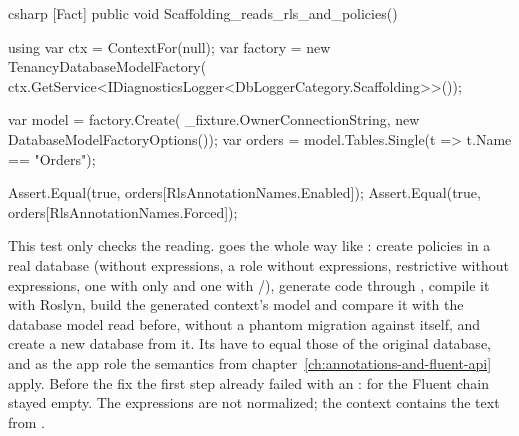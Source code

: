 \begin{sourcecode}{csharp}
[Fact]
public void Scaffolding_reads_rls_and_policies()
{
    using var ctx = ContextFor(null);
    var factory = new TenancyDatabaseModelFactory(
        ctx.GetService<IDiagnosticsLogger<DbLoggerCategory.Scaffolding>>());

    var model = factory.Create(
        _fixture.OwnerConnectionString, new DatabaseModelFactoryOptions());
    var orders = model.Tables.Single(t => t.Name == "Orders");

    Assert.Equal(true, orders[RlsAnnotationNames.Enabled]);
    Assert.Equal(true, orders[RlsAnnotationNames.Forced]);
}
\end{sourcecode}

This test only checks the reading.  goes
the whole way like : create policies in a real database
(without expressions,  a role without expressions, restrictive without
expressions, one with  only and one with /), generate code through
, compile it with Roslyn, build the
generated context's model and compare it with the database model read before, without a
phantom migration against itself, and create a new database from it. Its
 have to equal those of the original database, and as the app role
the semantics from chapter~\ref{ch:annotations-and-fluent-api} apply. Before the fix the first
step already failed with an :
for  the Fluent chain stayed empty. The expressions are not
normalized; the context contains the text from .

